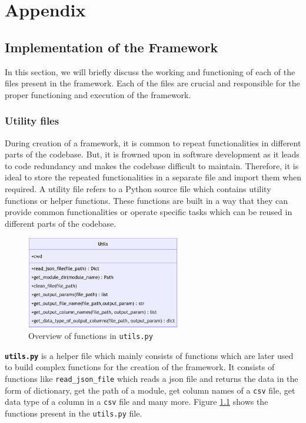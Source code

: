\appendix
\chapter{Appendix}
\section{Implementation of the Framework} \label{implementation_framework}
In this section, we will briefly discuss the working and functioning of each of the files present in the framework. Each of the files are crucial and responsible
for the proper functioning and execution of the framework. 

\subsection{Utility files}
During creation of a framework, it is common to repeat functionalities in different parts of the codebase. But, it is frowned upon in software development as 
it leads to code redundancy and makes the codebase difficult to maintain. Therefore, it is ideal to store the repeated functionalities in a separate file and
import them when required. A utility file refers to a Python source file  which contains utility functions or helper functions. These functions are built in a 
way that they can provide common functionalities or operate specific tasks which can be reused in different parts of the codebase. 
\begin{figure}[!ht] %
  \centering
  \includegraphics[width=0.6\textwidth]{Images/utils.pdf}
  \caption{Overview of functions in \texttt{utils.py}}

  \label{utils_overview}
\end{figure}

\textbf{\texttt{utils.py}} is a helper file which mainly consists of functions which are later used to build complex functions for the creation of the framework.
It consists of functions like \texttt{read\_json\_file} which reads a \acrshort{json} file and returns the data in the form of dictionary, get the path of a module,
get column names of a \texttt{csv} file, get data type of a column in a \texttt{csv} file and many more. Figure \ref{utils_overview} shows the functions present 
in the \texttt{utils.py} file.

